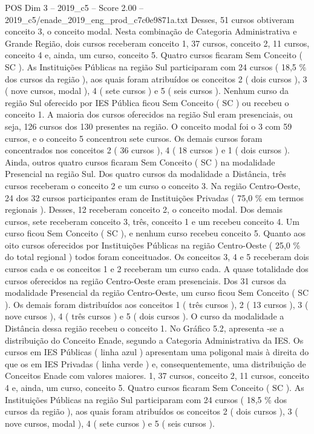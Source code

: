 \begin{textsample}{POS Dim 3 – 2019\_c5 – Score 2.00 – 2019\_c5/enade\_2019\_eng\_prod\_c7c0e9871a.txt}
Desses, 51 cursos obtiveram conceito 3, o conceito modal.
Nesta combinação de Categoria Administrativa e Grande Região, dois cursos receberam conceito 1, 37 cursos, conceito 2, 11 cursos, conceito 4 e, ainda, um curso, conceito 5.
Quatro cursos ficaram Sem Conceito ( SC ).
As Instituições Públicas na região Sul participaram com 24 cursos ( 18,5 \% dos cursos da região ), aos quais foram atribuídos os conceitos 2 ( dois cursos ), 3 ( nove cursos, modal ), 4 ( sete cursos ) e 5 ( seis cursos ).
Nenhum curso da região Sul oferecido por IES Pública ficou Sem Conceito ( SC ) ou recebeu o conceito 1.
A maioria dos cursos oferecidos na região Sul eram presenciais, ou seja, 126 cursos dos 130 presentes na região.
O conceito modal foi o 3 com 59 cursos, e o conceito 5 concentrou sete cursos.
Os demais cursos foram concentrados nos conceitos 2 ( 36 cursos ), 4 ( 18 cursos ) e 1 ( dois cursos ).
Ainda, outros quatro cursos ficaram Sem Conceito ( SC ) na modalidade Presencial na região Sul.
Dos quatro cursos da modalidade a Distância, três cursos receberam o conceito 2 e um curso o conceito 3.
Na região Centro-Oeste, 24 dos 32 cursos participantes eram de Instituições Privadas ( 75,0 \% em termos regionais ).
Desses, 12 receberam conceito 2, o conceito modal.
Dos demais cursos, sete receberam conceito 3, três, conceito 1 e um recebeu conceito 4.
Um curso ficou Sem Conceito ( SC ), e nenhum curso recebeu conceito 5.
Quanto aos oito cursos oferecidos por Instituições Públicas na região Centro-Oeste ( 25,0 \% do total regional ) todos foram conceituados.
Os conceitos 3, 4 e 5 receberam dois cursos cada e os conceitos 1 e 2 receberam um curso cada.
A quase totalidade dos cursos oferecidos na região Centro-Oeste eram presenciais.
Dos 31 cursos da modalidade Presencial da região Centro-Oeste, um curso ficou Sem Conceito ( SC ).
Os demais foram distribuídos aos conceitos 1 ( três cursos ), 2 ( 13 cursos ), 3 ( nove cursos ), 4 ( três cursos ) e 5 ( dois cursos ).
O curso da modalidade a Distância dessa região recebeu o conceito 1.
No Gráfico 5.2, apresenta -se a distribuição do Conceito Enade, segundo a Categoria Administrativa da IES.
Os cursos em IES Públicas ( linha azul ) apresentam uma poligonal mais à direita do que os em IES Privadas ( linha verde ) e, consequentemente, uma distribuição de Conceitos Enade com valores maiores. 1, 37 cursos, conceito 2, 11 cursos, conceito 4 e, ainda, um curso, conceito 5.
Quatro cursos ficaram Sem Conceito ( SC ).
As Instituições Públicas na região Sul participaram com 24 cursos ( 18,5 \% dos cursos da região ), aos quais foram atribuídos os conceitos 2 ( dois cursos ), 3 ( nove cursos, modal ), 4 ( sete cursos ) e 5 ( seis cursos ).

\end{textsample}
